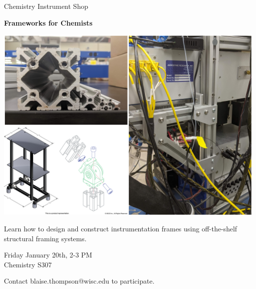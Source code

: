 \documentclass{article}
\begin{document}
\center

\Huge

Chemistry Instrument Shop

\textbf{
Frameworks for Chemists
}

\includegraphics[width=\linewidth]{coverart.png}

{
\huge
Learn how to design and construct instrumentation frames using off-the-shelf structural framing systems.
}

\vfill

{
\huge
Friday January 20th, 2-3 PM \\
Chemistry S307
}

\vfill

{
\huge
Contact blaise.thompson@wisc.edu to participate.
}
\end{document}
